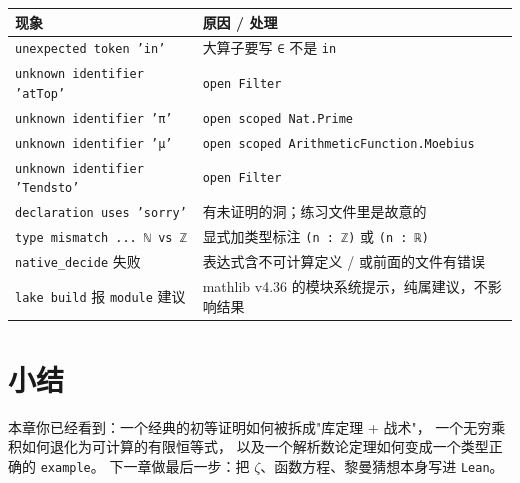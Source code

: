 \begin{center}\small
\begin{tabular}{@{}p{}p{}@{}}
\toprule
\textbf{现象} & \textbf{原因 / 处理}\\
\midrule
\texttt{unexpected token 'in'} & 大算子要写 \texttt{∈} 不是 \texttt{in}\\
\texttt{unknown identifier 'atTop'} & \texttt{open Filter}\\
\texttt{unknown identifier 'π'} & \texttt{open scoped Nat.Prime}\\
\texttt{unknown identifier 'μ'} & \texttt{open scoped ArithmeticFunction.Moebius}\\
\texttt{unknown identifier 'Tendsto'} & \texttt{open Filter}\\
\texttt{declaration uses 'sorry'} & 有未证明的洞；练习文件里是故意的\\
\texttt{type mismatch ... ℕ vs ℤ} & 显式加类型标注 \texttt{(n : ℤ)} 或 \texttt{(n : ℝ)}\\
\texttt{native\_decide} 失败 & 表达式含不可计算定义 / 或前面的文件有错误\\
\texttt{lake build} 报 \texttt{module} 建议 & mathlib v4.36 的模块系统提示，纯属建议，不影响结果\\
\bottomrule
\end{tabular}
\end{center}

\section{小结}
\label{sec:07-summary}

本章你已经看到：一个经典的初等证明如何被拆成"库定理 + 战术"，
一个无穷乘积如何退化为可计算的有限恒等式，
以及一个解析数论定理如何变成一个类型正确的 \texttt{example}。
下一章做最后一步：把 $\zeta$、函数方程、黎曼猜想本身写进 \texttt{Lean}。
